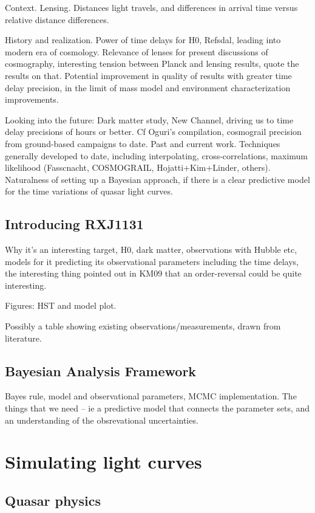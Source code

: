 \documentclass{emulateapj}
\begin{document}
Context. Lensing. Distances light travels, and differences in arrival
time versus relative distance differences.

History and realization. Power of time delays for H0, Refsdal, leading into modern
era of cosmology.  Relevance of lenses for present discussions of
cosmography, interesting tension between Planck and lensing results,
quote the results on that.  Potential improvement in quality of
results with greater time delay precision, in the limit of mass model
and environment characterization improvements. 

Looking into the future: Dark matter study, New Channel, driving us to
time delay precisions of hours or better.  Cf Oguri's compilation,
cosmograil precision from ground-based campaigns to date. Past and current work. 
Techniques generally developed to date, including interpolating, cross-correlations, maximum likelihood (Fasscnacht, COSMOGRAIL, Hojatti+Kim+Linder, others). Naturalness of setting up a Bayesian approach, if there is a clear predictive model for the time variations of quasar light curves. 

\subsection{Introducing RXJ1131}

Why it's an interesting target, H0, dark matter, observations with Hubble etc, models for it predicting its observational parameters including the time delays, the interesting thing pointed out in KM09 that an order-reversal could be quite interesting. 

Figures: HST and model plot. 

Possibly a table showing existing observations/measurements, drawn from literature. 

\subsection{Bayesian Analysis Framework}

Bayes rule, model and observational parameters, MCMC implementation. The things that we need -- ie a predictive model that connects the parameter sets, and an understanding of the obsrevational uncertainties.

\section{Simulating light curves}
\subsection{Quasar physics}
\end{document}
